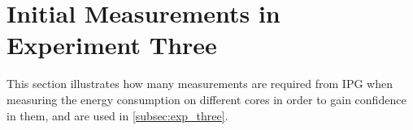 \section{Initial Measurements in Experiment Three}\label{app:exp_three_coch}

This section illustrates how many measurements are required from IPG when measuring the energy consumption on different cores in order to gain confidence in them, and are used in \cref{subsec:exp_three}.


